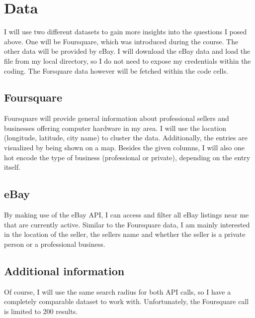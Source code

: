 \chapter{Data}
I will use two different datasets to gain more insights into the questions I posed above. One will be Foursquare, which was introduced during the course. The other data will be provided by eBay. I will download the eBay data and load the file from my local directory, so I do not need to expose my credentials within the coding. The Forsquare data however will be fetched within the code cells.
\section{Foursquare}
Foursquare will provide general information about professional sellers and businesses offering computer hardware in my area. I will use the location (longitude, latitude, city name) to cluster the data. Additionally, the entries are visualized by being shown on a map. Besides the given columns, I will also one hot encode the type of business (professional or private), depending on the entry itself.
\section{eBay}
By making use of the eBay API, I can access and filter all eBay listings near me that are currently active. Similar to the Foursquare data, I am mainly interested in the location of the seller, the sellers name and whether the seller is a private person or a professional business.
\section{Additional information}
Of course, I will use the same search radius for both API calls, so I have a completely comparable dataset to work with. Unfortunately, the Foursquare call is limited to 200 results.